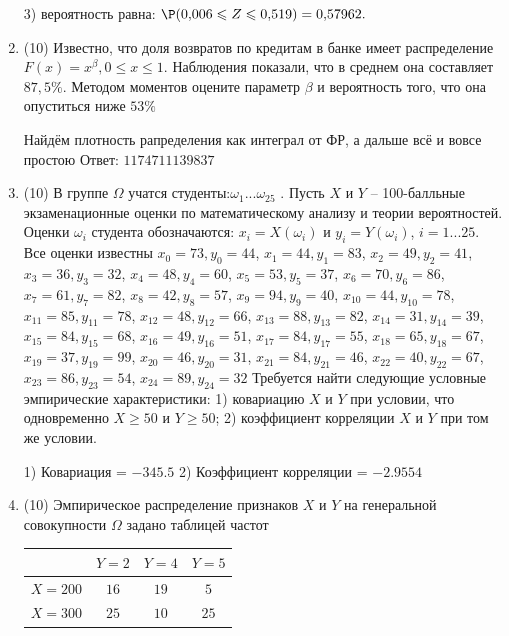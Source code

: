 \documentclass[a4paper,14pt]{article}
\begin{document}
\begin{enumerate}
3) вероятность равна:
$
\P(0,\!006\leqslant Z\leqslant 0,\!519)=
0,\!57962.
$


\item


(10) Известно, что доля возвратов по кредитам в банке имеет распределение $F(x) = x ^{\beta}, 0 \leqslant x \leqslant 1$.
Наблюдения показали, что в среднем она составляет $87,5\%$. Методом моментов оцените параметр $\beta$ и
вероятность того, что она опуститься ниже $53\%$




Найдём плотность рапределения как интеграл от ФР, а дальше всё и вовсе простою Ответ: $1174711139837$


\item


(10) В группе $\Omega$ учатся студенты:$\omega _{1}...\omega _{25}$ . Пусть $X$ и $Y$ – 100-балльные экзаменационные оценки по
математическому анализу и теории вероятностей. Оценки $\omega _{i}$ студента обозначаются: $x _{i} = X(\omega _{i})$ и $y _{i} = Y(\omega _{i})$, $i = 1...25$. Все оценки известны
$x _{0} = 73, y _{0} = 44$, $x _{1} = 44, y _{1} = 83$, $x _{2} = 49, y _{2} = 41$, $x _{3} = 36, y _{3} = 32$, $x _{4} = 48, y _{4} = 60$, $x _{5} = 53, y _{5} = 37$, $x _{6} = 70, y _{6} = 86$, $x _{7} = 61, y _{7} = 82$, $x _{8} = 42, y _{8} = 57$, $x _{9} = 94, y _{9} = 40$, $x _{10} = 44, y _{10} = 78$, $x _{11} = 85, y _{11} = 78$, $x _{12} = 48, y _{12} = 66$, $x _{13} = 88, y _{13} = 82$, $x _{14} = 31, y _{14} = 39$, $x _{15} = 84, y _{15} = 68$, $x _{16} = 49, y _{16} = 51$, $x _{17} = 84, y _{17} = 55$, $x _{18} = 65, y _{18} = 67$, $x _{19} = 37, y _{19} = 99$, $x _{20} = 46, y _{20} = 31$, $x _{21} = 84, y _{21} = 46$, $x _{22} = 40, y _{22} = 67$, $x _{23} = 86, y _{23} = 54$, $x _{24} = 89, y _{24} = 32$
Требуется
найти следующие условные эмпирические характеристики: 1) ковариацию $X$ и $Y$ при условии, что одновременно $X \geqslant 50$
 и $Y \geqslant 50$; 2) коэффициент корреляции $X$ и $Y$ при том же условии.




1) Ковариация = $-345.5$
2) Коэффициент корреляции = $-2.9554$


\item


(10) Эмпирическое распределение признаков $X$ и $Y$ на генеральной совокупности $\Omega$ задано таблицей частот  
 
\begin{tabular}{ | c | c | c | c | }
\hline
 & $Y = 2$ & $Y = 4$ & $Y = 5$  \\ \hline
$X = 200$ & $16$ & $19$ & $5$\\ \hline
$X = 300$ & $25$ & $10$ & $25$\\
\hline
\end{tabular}


\end{enumerate}
\end{document}
